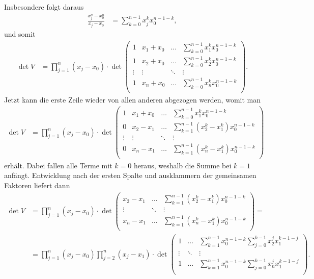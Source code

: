 \documentclass[english, parskip=full]{scrartcl}
\begin{document}
Insbesondere folgt daraus
\begin{align}
\frac{x_j^n-x_0^n}{x_j-x_0}&=\sum_{k=0}^{n-1}x_j^kx_0^{n-1-k},
\end{align}
und somit
\begin{align}
\det V&=\prod_{j=1}^n (x_j-x_0)\cdot\det\begin{pmatrix}
1&x_1+x_0&\dots&\sum_{k=0}^{n-1}x_1^kx_0^{n-1-k}\\
1&x_2+x_0&\dots&\sum_{k=0}^{n-1}x_2^kx_0^{n-1-k}\\
\vdots&\vdots &\ddots&\vdots\\
1&x_n+x_0&\dots&\sum_{k=0}^{n-1}x_n^kx_0^{n-1-k}\\
\end{pmatrix}.
\end{align}
Jetzt kann die erste Zeile wieder von allen anderen abgezogen werden, womit man
\begin{align}
\det V&=\prod_{j=1}^n (x_j-x_0)\cdot\det\begin{pmatrix}
1&x_1+x_0&\dots&\sum_{k=0}^{n-1}x_1^kx_0^{n-1-k}\\
0&x_2-x_1&\dots&\sum_{k=1}^{n-1}(x_2^k-x_1^k)x_0^{n-1-k}\\
\vdots&\vdots &\ddots&\vdots\\
0&x_n-x_1&\dots&\sum_{k=1}^{n-1}(x_n^k-x_1^k)x_0^{n-1-k}\\
\end{pmatrix}
\end{align}
erhält. 
Dabei fallen alle Terme mit $k=0$ heraus, weshalb die Summe bei $k=1$ anfängt.
Entwicklung nach der ersten Spalte und ausklammern der gemeinsamen Faktoren liefert dann
\begin{align}
\det V&=\prod_{j=1}^n (x_j-x_0)\cdot\det\begin{pmatrix}
x_2-x_1&\dots&\sum_{k=1}^{n-1}(x_2^k-x_1^k)x_0^{n-1-k}\\
\vdots &\ddots&\vdots\\
x_n-x_1&\dots&\sum_{k=1}^{n-1}(x_n^k-x_1^k)x_0^{n-1-k}\\
\end{pmatrix}=\\
&=\prod_{j=1}^n (x_j-x_0)\prod_{j=2}^n (x_j-x_1)\cdot\det\begin{pmatrix}
1&\dots&\sum_{k=1}^{n-1}x_0^{n-1-k}\sum_{j=0}^{k-1}x_2^jx_1^{k-1-j}\\
\vdots &\ddots&\vdots\\
1&\dots&\sum_{k=1}^{n-1}x_0^{n-1-k}\sum_{j=0}^{k-1}x_n^jx_1^{k-1-j}\\
\end{pmatrix}.
\end{align}
\end{document}
